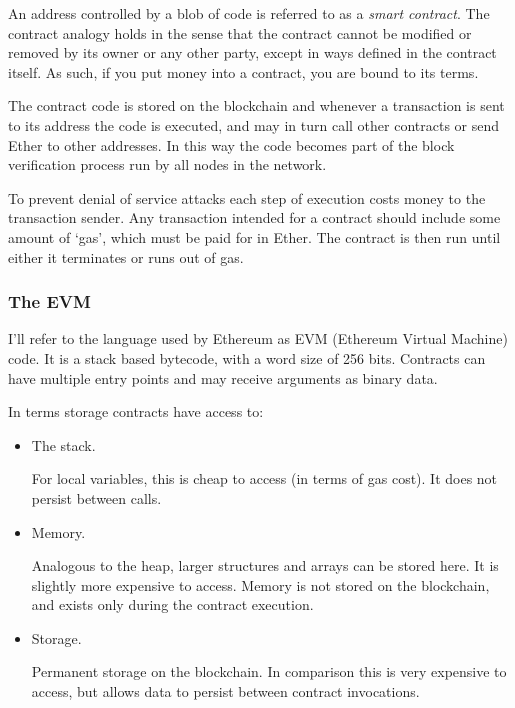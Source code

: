 \documentclass[10pt,twoside,a4paper]{article}
\begin{document}
An address controlled by a blob of code is referred to as a \textit{smart contract}.
The contract analogy holds in the sense that the contract cannot be modified or removed by
its owner or any other party, except in ways defined in the contract itself.
As such, if you put money into a contract, you are bound to its terms.

The contract code is stored on the blockchain and whenever a transaction is sent to its address the code is executed,
and may in turn call other contracts or send Ether to other addresses.
In this way the code becomes part of the block verification process run by all nodes in the network.

To prevent denial of service attacks each step of execution costs money to the transaction sender.
Any transaction intended for a contract should include some amount of `gas', which must be paid for in Ether.
The contract is then run until either it terminates or runs out of gas.

\subsubsection{The EVM}


I'll refer to the language used by Ethereum as EVM (Ethereum Virtual Machine) code.
It is a stack based bytecode, with a word size of 256 bits.
Contracts can have multiple entry points and may receive arguments as binary data.

In terms storage contracts have access to:

\begin{itemize}
\item The stack.

For local variables, this is cheap to access (in terms of gas cost).
It does not persist between calls.

\item Memory.

Analogous to the heap, larger structures and arrays can be stored here.
It is slightly more expensive to access.
Memory is not stored on the blockchain, and exists only during the contract execution.

\item Storage.

Permanent storage on the blockchain.
In comparison this is very expensive to access, but allows data to persist between contract invocations.
\end{itemize}
\end{document}

